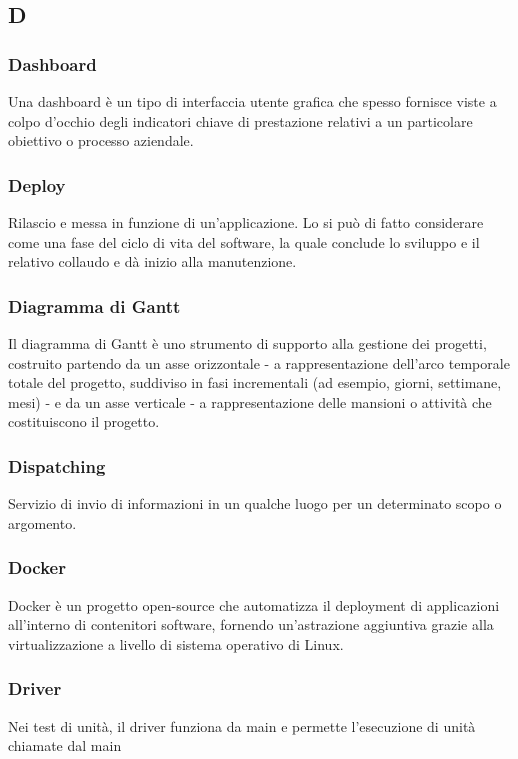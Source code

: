 \subsection*{\textbf{\hfill \Huge{D} \hfill}} 
\subsubsection*{Dashboard}
Una dashboard è un tipo di interfaccia utente grafica che spesso fornisce viste a colpo d’occhio degli indicatori chiave di prestazione relativi a un particolare obiettivo o processo aziendale.
\subsubsection*{Deploy}
Rilascio e messa in funzione di un'applicazione. Lo si può di fatto considerare come una fase del ciclo di vita del software, la quale conclude lo sviluppo e il relativo collaudo e dà inizio alla manutenzione.
\subsubsection*{Diagramma di Gantt}
Il diagramma di Gantt è uno strumento di supporto alla gestione dei progetti, costruito partendo da un asse orizzontale - a rappresentazione dell'arco temporale totale del progetto, suddiviso in fasi incrementali (ad esempio, giorni, settimane, mesi) - e da un asse verticale - a rappresentazione delle mansioni o attività che costituiscono il progetto.
\subsubsection*{Dispatching}
Servizio di invio di informazioni in un qualche luogo per un determinato scopo o argomento.
\subsubsection*{Docker}
Docker è un progetto open-source che automatizza il deployment di applicazioni all'interno di contenitori software, fornendo un'astrazione aggiuntiva grazie alla virtualizzazione a livello di sistema operativo di Linux.
\subsubsection*{Driver}
Nei test di unità, il driver funziona da main e permette l'esecuzione di unità chiamate dal main
